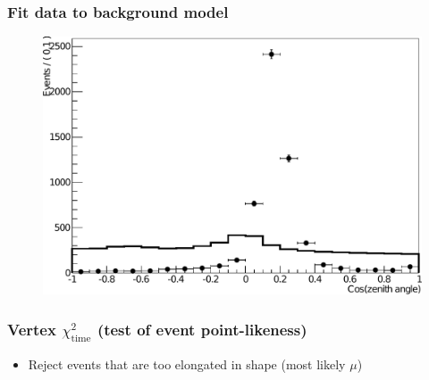 \documentclass[14pt]{beamer}
\begin{document}
\begin{frame}
	\frametitle{Fit data to background model}
	\begin{figure}
		\centering
		\includegraphics[width=\linewidth]{fit_data_to_bkg_model_noChi2TCut.pdf}
	\end{figure}
\end{frame}

\begin{frame}
	\frametitle{Vertex $\chi^{2}_{\mathrm{time}}$ (test of event point-likeness)}
	\centering
	\begin{itemize}
		\item<2-> Reject events that are too elongated in shape (most likely
			$\mu$)
	\end{itemize}
\end{frame}
\end{document}
